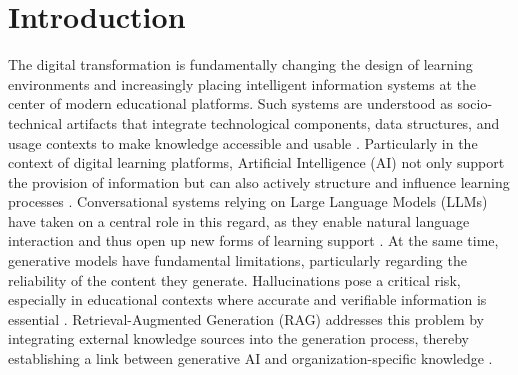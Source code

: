 
\section{Introduction}
The digital transformation is fundamentally changing the design of learning environments and increasingly placing intelligent information systems at the center of modern educational platforms. Such systems are understood as socio-technical artifacts that integrate technological components, data structures, and usage contexts to make knowledge accessible and usable \autocite{Klesel2025}. Particularly in the context of digital learning platforms, Artificial Intelligence (AI) not only support the provision of information but can also actively structure and influence learning processes \autocite{ZawackiRichter2019}. Conversational systems relying on Large Language Models (LLMs) have taken on a central role in this regard, as they enable natural language interaction and thus open up new forms of learning support \autocite{Oates2025ChatGPTClassroom}. At the same time, generative models have fundamental limitations, particularly regarding the reliability of the content they generate. Hallucinations pose a critical risk, especially in educational contexts where accurate and verifiable information is essential \autocite{Feuerriegel2024}. Retrieval-Augmented Generation (RAG) addresses this problem by integrating external knowledge sources into the generation process, thereby establishing a link between generative AI and organization-specific knowledge \autocite{Lewis2020_RAG,Klesel2025}.

